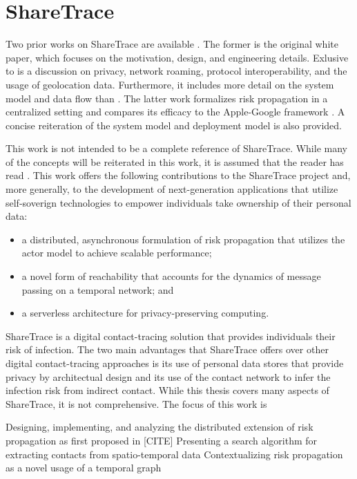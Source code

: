 \section{ShareTrace}
Two prior works on ShareTrace are available \cite{Ayday2020, Ayday2021}. The
former is the original white paper, which focuses on the motivation, design,
and engineering details. Exlusive to \cite{Ayday2020} is a discussion on
privacy, network roaming, protocol interoperability, and the usage of
geolocation data. Furthermore, it includes more detail on the system model and
data flow than \cite{Ayday2021}. The latter work formalizes risk propagation in
a centralized setting and compares its efficacy to the Apple-Google framework
\cite{AppleGoogle}. A concise reiteration of the system model and deployment
model is also provided.

This work is not intended to be a complete reference of ShareTrace. While many
of the concepts will be reiterated in this work, it is assumed that the reader
has read \cite{Ayday2020, Ayday2021}. This work offers the following
contributions to the ShareTrace project and, more generally, to the development
of next-generation applications that utilize self-soverign technologies to
empower individuals take ownership of their personal data:
	\begin{itemize}
		\item a distributed, asynchronous formulation of risk propagation that utilizes the actor model to achieve scalable performance;
		\item a novel form of reachability that accounts for the dynamics of message
passing on a temporal network; and
		\item a serverless architecture for privacy-preserving computing.
	\end{itemize}

ShareTrace is a digital contact-tracing solution that provides individuals
their risk of infection. The two main advantages that ShareTrace offers over
other digital contact-tracing approaches is its use of personal data stores
that provide privacy by architectual design and its use of the contact network
to infer the infection risk from indirect contact. While this thesis covers
many aspects of ShareTrace, it is not comprehensive. The focus of this work
is

Designing, implementing, and analyzing the distributed extension of risk
propagation as first proposed in [CITE]
Presenting a search algorithm for extracting contacts from spatio-temporal
data
Contextualizing risk propagation as a novel usage of a temporal graph

